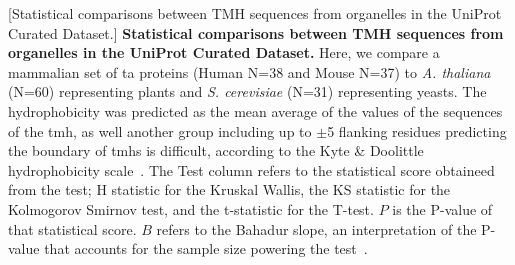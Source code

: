 	\begin{table}[htbp]
	\centering
	[Statistical comparisons between TMH sequences from organelles in the UniProt Curated Dataset.]
	{\textbf{Statistical comparisons between TMH sequences from organelles in the UniProt Curated Dataset.}
	Here, we compare a mammalian set of \gls{ta} proteins (Human N=38 and Mouse N=37) to \textit{A. thaliana} (N=60) representing plants  and  \textit{S. cerevisiae} (N=31) representing yeasts.
	The hydrophobicity was predicted as the mean average of the values of the sequences of the \gls{tmh}, as well another group including up to $\pm$5 flanking residues predicting the boundary of \gls{tmh}s is difficult, according to the Kyte \& Doolittle hydrophobicity scale~\cite{Kyte1982}.
	The Test column refers to the statistical score obtaineed from the test; H statistic for the Kruskal Wallis, the KS statistic for the Kolmogorov Smirnov test, and the t-statistic for the T-test.
	$P$ is the P-value of that statistical score.
	$B$ refers to the Bahadur slope, an interpretation of the P-value that accounts for the sample size powering the test~\cite{Bahadur1967, Bahadur1971}.}
		\tiny


\end{table}
